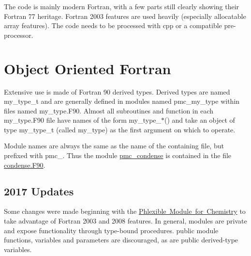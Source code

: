 The code is mainly modern Fortran, with a few parts still clearly showing their Fortran 77 heritage. Fortran 2003 features are used heavily (especially allocatable array features). The code needs to be processed with {\ttfamily cpp} or a compatible pre-\/processor.\hypertarget{coding_style_oo_fortran}{}\section{Object Oriented Fortran}\label{coding_style_oo_fortran}
Extensive use is made of Fortran 90 derived types. Derived types are named {\ttfamily my\+\_\+type\+\_\+t} and are generally defined in modules named {\ttfamily pmc\+\_\+my\+\_\+type} within files named {\ttfamily my\+\_\+type.\+F90}. Almost all subroutines and function in each {\ttfamily my\+\_\+type.\+F90} file have names of the form {\ttfamily my\+\_\+type\+\_\+$\ast$}() and take an object of type {\ttfamily my\+\_\+type\+\_\+t} (called {\ttfamily my\+\_\+type}) as the first argument on which to operate.

Module names are always the same as the name of the containing file, but prefixed with {\ttfamily pmc\+\_\+}. Thus the module {\ttfamily \mbox{\hyperlink{namespacepmc__condense}{pmc\+\_\+condense}}} is contained in the file {\ttfamily \mbox{\hyperlink{condense_8_f90}{condense.\+F90}}}.\hypertarget{coding_style_update_2017}{}\subsection{2017 Updates}\label{coding_style_update_2017}
Some changes were made beginning with the \mbox{\hyperlink{phlex_chem}{Phlexible Module for Chemistry}} to take advantage of Fortran 2003 and 2008 features. In general, modules are {\ttfamily private} and expose functionality through type-\/bound procedures. {\ttfamily public} module functions, variables and parameters are discouraged, as are {\ttfamily public} derived-\/type variables.

